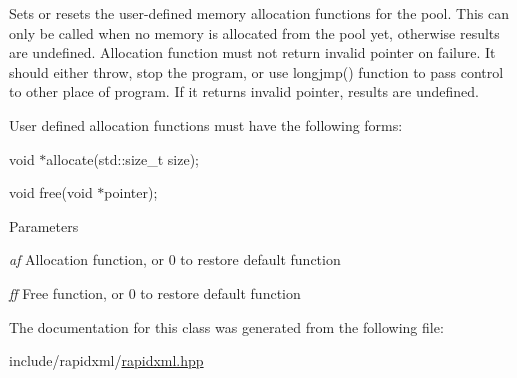 \label{d1/d46/classrapidxml_1_1memory__pool_a84d3d8d2cdfc00501e1dcf26d889ae03}
Sets or resets the user-\/defined memory allocation functions for the pool. This can only be called when no memory is allocated from the pool yet, otherwise results are undefined. Allocation function must not return invalid pointer on failure. It should either throw, stop the program, or use {\ttfamily longjmp()} function to pass control to other place of program. If it returns invalid pointer, results are undefined. \par
\par
 User defined allocation functions must have the following forms: \par
{\ttfamily  \par
void $\ast$allocate(std::size\_\-t size); \par
void free(void $\ast$pointer); }\par
 
\begin{DoxyParams}{Parameters}
\item[{\em af}]Allocation function, or 0 to restore default function \item[{\em ff}]Free function, or 0 to restore default function \end{DoxyParams}


The documentation for this class was generated from the following file:\begin{DoxyCompactItemize}
\item 
include/rapidxml/\hyperlink{rapidxml_8hpp}{rapidxml.hpp}\end{DoxyCompactItemize}
